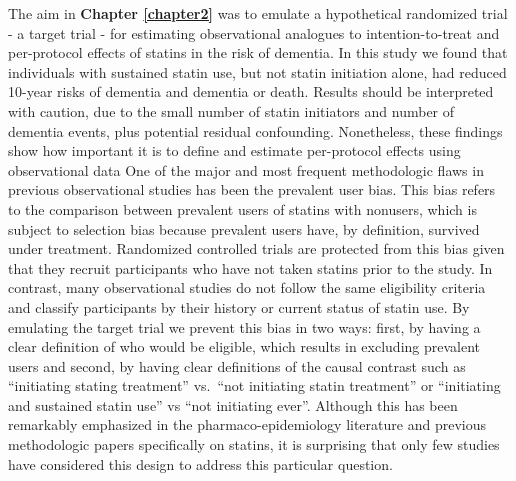 \documentclass[
]{book}
\begin{document}
The aim in \textbf{Chapter \ref{chapter2}} was to emulate a hypothetical randomized trial - a target trial - for estimating observational analogues to intention-to-treat and per-protocol effects of statins in the risk of dementia. In this study we found that individuals with sustained statin use, but not statin initiation alone, had reduced 10-year risks of dementia and dementia or death. Results should be interpreted with caution, due to the small number of statin initiators and number of dementia events, plus potential residual confounding. Nonetheless, these findings show how important it is to define and estimate per-protocol effects using observational data
One of the major and most frequent methodologic flaws in previous observational studies has been the prevalent user bias\autocite{luijken2021,power2015}. This bias refers to the comparison between prevalent users of statins with nonusers, which is subject to selection bias because prevalent users have, by definition, survived under treatment\autocite{hernan2008,danaei2012}. Randomized controlled trials are protected from this bias given that they recruit participants who have not taken statins prior to the study. In contrast, many observational studies do not follow the same eligibility criteria and classify participants by their history or current status of statin use. By emulating the target trial we prevent this bias in two ways\autocite{hernan2016,hernan_robins_2016}: first, by having a clear definition of who would be eligible, which results in excluding prevalent users and second, by having clear definitions of the causal contrast such as ``initiating stating treatment'' vs.~``not initiating statin treatment'' or ``initiating and sustained statin use'' vs ``not initiating ever''. Although this has been remarkably emphasized in the pharmaco-epidemiology literature\autocite{ray2003,lund2015,johnson2013} and previous methodologic papers specifically on statins\autocite{danaei2012,power2015,emilsson2018}, it is surprising that only few studies have considered this design to address this particular question.
\end{document}

